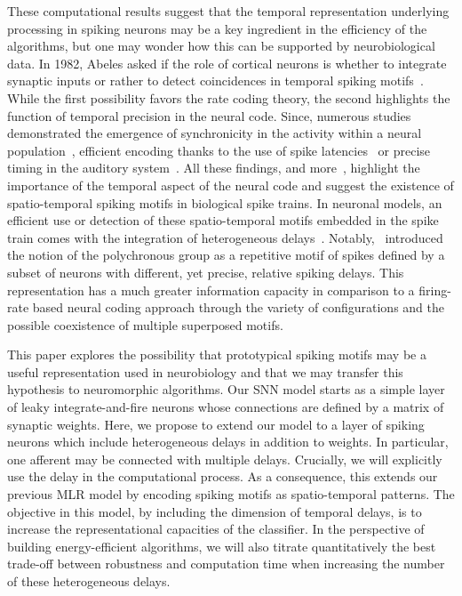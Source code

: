 \documentclass[default]{sn-jnl}%
\theoremstyle{thmstyleone}%
\theoremstyle{thmstyletwo}%
\theoremstyle{thmstylethree}%
\begin{document}
These computational results suggest that the temporal representation underlying processing in spiking neurons may be a key ingredient in the efficiency of the algorithms, but one may wonder how this can be supported by neurobiological data. In 1982, Abeles asked if the role of cortical neurons is whether to integrate synaptic inputs or rather to detect coincidences in temporal spiking motifs~\citep{abeles_role_1982}. While the first possibility favors the rate coding theory, the second highlights the function of temporal precision in the neural code. Since, numerous studies demonstrated the emergence of synchronicity in the activity within a neural population~\citep{riehle_spike_1997, davis_spontaneous_2021}, efficient encoding thanks to the use of spike latencies~\citep{perrinet_coding_2004, gollisch_rapid_2008} or precise timing in the auditory system~\citep{deweese_binary_2002, carr_circuit_1990}. All these findings, and more~\citep{bohte_evidence_2004}, highlight the importance of the temporal aspect of the neural code and suggest the existence of spatio-temporal spiking motifs in biological spike trains. In neuronal models, an efficient use or detection of these spatio-temporal motifs embedded in the spike train comes with the integration of heterogeneous delays~\citep{gutig_tempotron_2006, guise_bayesian_2014, zhang_supervised_2020}. Notably,~\citet{izhikevich_polychronization_2006} introduced the notion of the polychronous group as a repetitive motif of spikes defined by a subset of neurons with different, yet precise, relative spiking delays. This representation has a much greater information capacity in comparison to a firing-rate based neural coding approach through the variety of configurations and the possible coexistence of multiple superposed motifs.

This paper explores the possibility that prototypical spiking motifs may be a useful representation used in neurobiology and that we may transfer this hypothesis to neuromorphic algorithms. Our SNN model starts as a simple layer of leaky integrate-and-fire neurons whose connections are defined by a matrix of synaptic weights. Here, we propose to extend our model to a layer of spiking neurons which include heterogeneous delays in addition to weights. In particular, one afferent may be connected with multiple delays. Crucially, we will explicitly use the delay in the computational process. As a consequence, this extends our previous MLR model by encoding spiking motifs as spatio-temporal patterns. The objective in this model, by including the dimension of temporal delays, is to increase the representational capacities of the classifier. In the perspective of building energy-efficient algorithms, we will also titrate quantitatively the best trade-off between robustness and computation time when increasing the number of these heterogeneous delays. %
%
\end{document}
